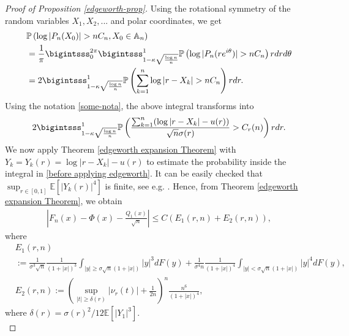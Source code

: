 \documentclass[9pt,a4paper,reqno]{amsart}
\theoremstyle{mine}
\theoremstyle{definition}
\theoremstyle{remark}
\newcommand{\mb}{\mathbb}
\begin{document}
\begin{proof}[Proof of Proposition \ref{edgeworth-prop}]
    Using the rotational symmetry of the random variables $X_1, X_2, ...$ and polar coordinates, we get
\begin{align}\label{proposition for main term}
    &\mathbb{P}\left(\log|P_n(X_0)| > n C_n, X_0 \in \mb{A}_n\right) \nonumber  \\ 
    &=\frac{1}{\pi}\bigintsss_{0}^{2\pi}\bigintsss_{ 1- \kappa\sqrt{\frac{\log n}{n}}}^1 \mathbb{P}\left(\log|P_n(re^{i \theta})| > n C_n\right) rdrd\theta \nonumber \\
    &=2\bigintsss_{ 1- \kappa\sqrt{\frac{\log n}{n}}}^1 \mathbb{P}\left({\sum_{k=1}^n\log|r-X_k|} >nC_n\right) rdr.
\end{align}
Using the notation \eqref{some-nota}, the above integral transforms into 
\begin{align}\label{before applying edgeworth}
   2 \bigintsss_{ 1- \kappa\sqrt{\frac{\log n}{n}}}^1 \mathbb{P}\left(\frac{\sum_{k=1}^n(\log|r-X_k|- u(r))}{\sqrt{n}\sigma(r)} > C_r(n)\right)rdr.
\end{align}
We now apply Theorem \ref{edgeworth expansion Theorem} with $Y_k = Y_k(r) = \log|r-X_k|- u(r)$ to estimate the probability inside the integral in \eqref{before applying edgeworth}. It can be easily checked that 
$\sup_{r\in [0,1]}\mb{E}[|Y_k(r)|^4]$ is finite, see e.g. \cite[Lemma 2.3]{Ghosh-numberofcomponents}. Hence, from Theorem \ref{edgeworth expansion Theorem}, we obtain 
\begin{align}\label{main probability bound after using the edgeworth expansion}
    \left| F_{n}(x)- \Phi(x)- \frac{Q_{1}(x)}{\sqrt{n}}\right| \leq C \left( E_1(r,n)+ E_2(r,n)\right),
\end{align}
where
\begin{align*}
    &E_1(r,n)\\ &:=\frac{1}{\sigma^3 \sqrt{n}} \frac{1}{(1+|x|)^3} \int_{|y|\geq \sigma\sqrt{n}(1+|x|)} |y|^3 dF(y)+\frac{1}{\sigma^4 n}\frac{1}{(1+|x|)^4} \int_{|y|< \sigma\sqrt{n}(1+|x|)}  |y|^4 dF(y),\\[1em]
    &E_2(r,n):=\left( \sup_{|t|\geq \delta(r)} |\nu_r(t)|+\frac{1}{2n}\right)^n  \frac{n^6}{(1+|x|)^4},
\end{align*}
    where $\delta(r)=\sigma(r)^2/12\mb{E}[|Y_1|^3]$. \\
    

\end{proof}
\end{document}
